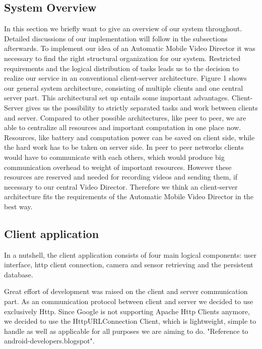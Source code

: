 \documentclass[conference]{IEEEtran}
\begin{document}
\subsection{System Overview}
In this section we briefly want to give an overview of our system throughout. Detailed discussions of our implementation will follow in the subsections afterwards. 
To implement our idea of an Automatic Mobile Video Director it was necessary to find the right structural organization for our system. Restricted requirements and the logical distribution of tasks leads us to the decision to realize our service in an conventional client-server architecture. Figure 1 shows our general system architecture, consisting of multiple clients and one central server part.
This architectural set up entails some important advantages. Client-Server gives us the possibility to strictly separated tasks and work between clients and server. Compared to other possible architectures, like peer to peer, we are able  to centralize all resources and important computation in one place now. Resources, like battery and computation power can be saved on client side, while the hard work has to be taken on server side. In peer to peer networks clients would have to communicate with each others, which would produce big communication overhead to weight of important resources. However these resources are reserved and needed for recording videos and sending them, if necessary to our central Video Director. Therefore we think an client-server architecture fits the requirements of the Automatic Mobile Video Director in the best way. 


\subsection{Client application}

In a nutshell, the client application consists of four main logical components: user interface, http client connection, camera and sensor retrieving and the persistent database.

Great effort of development was raised on the client and server communication part. As an communication protocol between client and server we decided to use exclusively Http. Since Google is not supporting Apache Http Clients anymore, we decided to use the HttpURLConnection Client, which is lightweight, simple to handle as well as applicable for all purposes we are aiming to do. "Reference to android-developers.blogspot".
\end{document}
